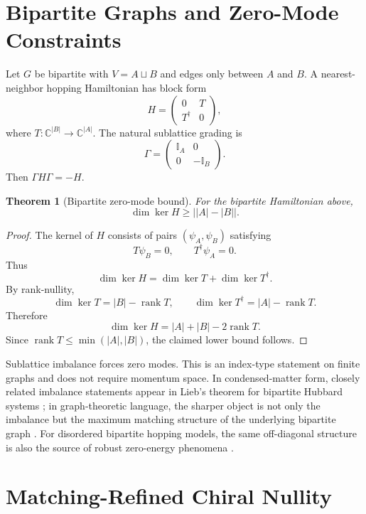 \documentclass[11pt,a4paper]{article}
\newtheorem{theorem}{Theorem}
\newcommand{\bbC}{\mathbb{C}}
\newcommand{\bbI}{\mathbb{I}}
\newcommand{\Gammaop}{\Gamma}
\newcommand{\kerdim}{\dim\ker}
\begin{document}
\section{Bipartite Graphs and Zero-Mode Constraints}

Let $G$ be bipartite with $V=A\sqcup B$ and edges only between $A$ and $B$. A
nearest-neighbor hopping Hamiltonian has block form
\[
  H =
  \begin{pmatrix}
    0 & T\\
    T^\dagger & 0
  \end{pmatrix},
\]
where $T:\bbC^{|B|}\to\bbC^{|A|}$. The natural sublattice grading is
\[
  \Gammaop =
  \begin{pmatrix}
    \bbI_A & 0\\
    0 & -\bbI_B
  \end{pmatrix}.
\]
Then $\Gammaop H\Gammaop=-H$.

\begin{theorem}[Bipartite zero-mode bound]
For the bipartite Hamiltonian above,
\[
  \kerdim H \geq \big||A|-|B|\big|.
\]
\end{theorem}

\begin{proof}
The kernel of $H$ consists of pairs $(\psi_A,\psi_B)$ satisfying
\[
  T\psi_B=0,\qquad T^\dagger\psi_A=0.
\]
Thus
\[
  \kerdim H = \dim\ker T+\dim\ker T^\dagger.
\]
By rank-nullity,
\[
  \dim\ker T = |B|-\operatorname{rank}T,\qquad
  \dim\ker T^\dagger = |A|-\operatorname{rank}T.
\]
Therefore
\[
  \kerdim H=|A|+|B|-2\operatorname{rank}T.
\]
Since $\operatorname{rank}T\leq \min(|A|,|B|)$, the claimed lower bound follows.
\end{proof}

Sublattice imbalance forces zero modes. This is an index-type statement on
finite graphs and does not require momentum space. In condensed-matter form,
closely related imbalance statements appear in Lieb's theorem for bipartite
Hubbard systems \cite{Lieb1989}; in graph-theoretic language, the sharper
object is not only the imbalance but the maximum matching structure of the
underlying bipartite graph \cite{DulmageMendelsohn1958}.
For disordered bipartite hopping models, the same off-diagonal structure is
also the source of robust zero-energy phenomena \cite{InuiTrugmanAbrahams1994}.

\section{Matching-Refined Chiral Nullity}
\end{document}
